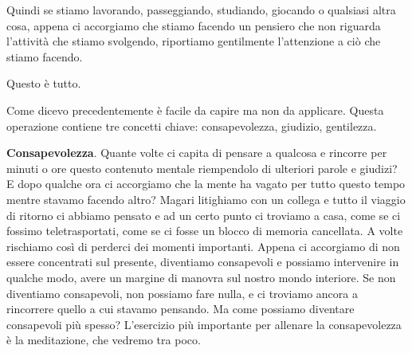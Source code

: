 \documentclass[12pt]{book} %
\begin{document}
Quindi se stiamo lavorando, passeggiando, studiando, giocando o qualsiasi altra cosa, appena ci accorgiamo che stiamo
facendo un pensiero che non riguarda l'attività che stiamo svolgendo, riportiamo gentilmente
l'attenzione a ciò che stiamo facendo. 

Questo è tutto.

Come dicevo precedentemente è facile da capire ma non da applicare. Questa operazione contiene tre concetti chiave:
consapevolezza, giudizio, gentilezza.

\textbf{Consapevolezza}. Quante volte ci capita di pensare a qualcosa e rincorre per minuti o ore questo contenuto mentale
riempendolo di ulteriori parole e giudizi? E dopo qualche ora ci accorgiamo che la mente ha vagato per tutto questo
tempo mentre stavamo facendo altro? Magari litighiamo con un collega e tutto il viaggio di ritorno ci abbiamo pensato e
ad un certo punto ci troviamo a casa, come se ci fossimo teletrasportati, come se ci fosse un blocco di memoria
cancellata. A volte rischiamo così di perderci dei momenti importanti. Appena ci accorgiamo di non essere concentrati
sul presente, diventiamo consapevoli e possiamo intervenire in qualche modo, avere un margine di manovra sul nostro
mondo interiore. Se non diventiamo consapevoli, non possiamo fare nulla, e ci troviamo ancora a rincorrere quello a cui
stavamo pensando. Ma come possiamo diventare consapevoli più spesso? L'esercizio più importante
per allenare la consapevolezza è la meditazione, che vedremo tra poco.
\end{document}
